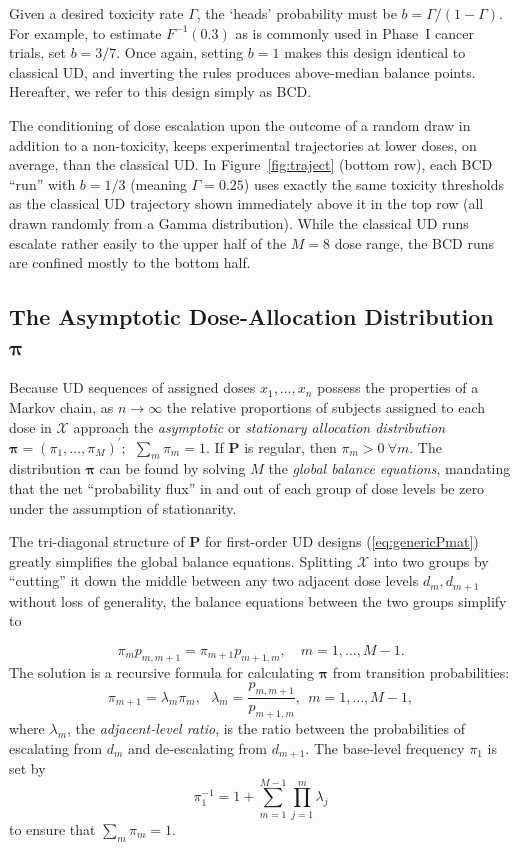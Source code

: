 Given a desired toxicity rate $\Gamma$, the `heads' probability must be $b=\Gamma/(1-\Gamma)$. For example, to estimate $F^{-1}(0.3)$ as is commonly used in Phase~I cancer trials, set $b=3/7$. Once again, setting $b=1$ makes this design identical to classical UD, and inverting the rules produces above-median balance points. Hereafter, we refer to this design simply as BCD.

The conditioning of dose escalation upon the outcome of a random draw in addition to a non-toxicity, keeps experimental trajectories at lower doses, on average, than the classical UD. In Figure~\ref{fig:traject} (bottom row), each BCD ``run'' with $b=1/3$ (meaning $\Gamma=0.25$) uses exactly the same toxicity thresholds as the classical UD trajectory shown immediately above it in the top row (all drawn randomly from a Gamma distribution). While the classical UD runs escalate rather easily to the upper half of the $M=8$ dose range, the BCD runs are confined mostly to the bottom half.

\subsection{The Asymptotic Dose-Allocation Distribution $\boldsymbol{\pi}$}\label{sec:pi}

Because UD sequences of assigned doses $x_1,\ldots,x_n$ possess the properties of a Markov chain, as $n\to\infty$ the relative proportions of subjects assigned to each dose in $\mathcal{X}$ approach the \emph{asymptotic} or \emph{stationary allocation distribution} $\boldsymbol{\pi}=\left(\pi_1,\ldots,\pi_M\right)^{\prime};\ \ \sum_m \pi_m=1.$  If $\mathbf{P}$ is regular, then $\pi_m>0\ \forall m$. The distribution $\boldsymbol{\pi}$ can be found by solving $M$ the \emph{global balance equations}, mandating that the net ``probability flux'' in and out of each group of dose levels be zero under the assumption of stationarity.

The tri-diagonal structure of $\mathbf{P}$ for first-order UD designs (\ref{eq:genericPmat}) greatly simplifies the global balance equations. Splitting $\mathcal{X}$ into two groups by ``cutting'' it down the middle between any two adjacent dose levels $d_m,d_{m+1}$ without loss of generality, the balance equations between the two groups simplify to

\begin{equation}\label{eq:balance}
\pi_mp_{m,m+1}=\pi_{m+1}p_{m+1,m},\quad m=1,\ldots,M-1.
\end{equation}
The solution is a recursive formula for calculating $\boldsymbol{\pi}$ from transition probabilities:
\begin{equation}\label{eq:balance_solution}
\pi_{m+1}=\lambda_m \pi_m,\ \ \ \lambda_m=\frac{p_{m,m+1}}{p_{m+1,m}},\ \  m=1,\ldots,M-1,
\end{equation}
where $\lambda_m$,  the \emph{adjacent-level ratio}, is the ratio between the probabilities of escalating from $d_m$ and de-escalating from $d_{m+1}$. The base-level frequency $\pi_1$ is set by
\begin{equation*}
\pi_1^{-1}=1+\displaystyle\sum_{m=1}^{M-1}\displaystyle\prod_{j=1}^m\lambda_j
\end{equation*}
\noindent to ensure that $\sum_m \pi_m=1$.

